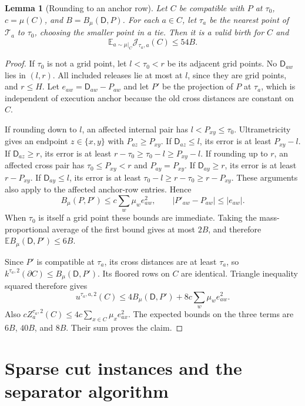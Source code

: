 \documentclass[11pt]{article}
\newtheorem{lemma}[theorem]{Lemma}
\theoremstyle{definition}
\newcommand{\E}{\mathbb E}
\newcommand{\cut}{\partial}
\begin{document}
\begin{lemma}[Rounding to an anchor row]\label{l2:lem:round}
Let $C$ be compatible with $P$ at $\tau_0$, $c=\mu(C)$, and
$B=B_\mu(\mathsf D,P)$. For each $a\in C$, let $\tau_a$ be the nearest point
of $\mathcal T_a$ to $\tau_0$, choosing the smaller point in a tie. Then it is a valid birth for $C$ and
\[
 \E_{a\sim\mu|_C}\mathcal J_{\tau_a,a}(C)\le54B.
\]
\end{lemma}
\begin{proof}
If $\tau_0$ is not a grid point, let $l<\tau_0<r$ be its adjacent
grid points. No $\mathsf D_{aw}$ lies in $(l,r)$. All included releases lie
at most at $l$, since they are grid points, and $r\le H$.
Let $e_{aw}=\mathsf D_{aw}-P_{aw}$ and let $P'$ be the projection of $P$ at
$\tau_a$, which is independent of execution anchor because the old
cross distances are constant on $C$.

If rounding down to $l$, an affected internal pair has
$l<P_{xy}\le\tau_0$. Ultrametricity gives an endpoint $z\in\{x,y\}$
with $P_{az}\ge P_{xy}$. If $\mathsf D_{az}\le l$, its error is at least
$P_{xy}-l$. If $\mathsf D_{az}\ge r$, its error is at least
$r-\tau_0\ge\tau_0-l\ge P_{xy}-l$.
If rounding up to $r$, an affected cross pair has
$\tau_0\le P_{xy}<r$ and $P_{ay}=P_{xy}$. If $\mathsf D_{ay}\ge r$, its
error is at least $r-P_{xy}$. If $\mathsf D_{ay}\le l$, its error is at least
$\tau_0-l\ge r-\tau_0\ge r-P_{xy}$.
These arguments also apply to the affected anchor-row entries. Hence
\begin{equation}\label{l2:eq:round-cost}
 B_\mu(P,P')\le c\sum_w\mu_w e_{aw}^2,
 \qquad |P'_{aw}-P_{aw}|\le|e_{aw}|.
\end{equation}
When $\tau_0$ is itself a grid point these bounds are immediate.
Taking the mass-proportional average of the first bound gives at most
$2B$, and therefore $\E B_\mu(\mathsf D,P')\le6B$.

Since $P'$ is compatible at $\tau_a$, its cross distances are at least
$\tau_a$, so $k^{\tau_a,2}(\cut C)\le B_\mu(\mathsf D,P')$.
Its floored rows on $C$ are identical. Triangle inequality squared
therefore gives
\[
 u^{\tau_a,a,2}(C)\le4B_\mu(\mathsf D,P')
       +8c\sum_w\mu_w e_{aw}^2.
\]
Also $cZ^{\tau_a,2}_a(C)\le4c\sum_{x\in C}\mu_xe_{ax}^2$.
The expected bounds on the three terms are $6B$, $40B$, and $8B$.
Their sum proves the claim.
\end{proof}

\section{Sparse cut instances and the separator algorithm}
\end{document}
